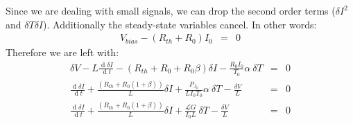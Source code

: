 \documentclass[letterpaper,10pt]{article}
\begin{document}
Since we are dealing with small signals, we can drop the second order terms (${\delta I}^2$ and ${\delta T}{\delta I}$). Additionally the steady-state variables cancel. In other words:
\begin{eqnarray}
	V_{bias} - ( R_{th} + R_0 ) I_0 &=& 0
\end{eqnarray}
Therefore we are left with:
\begin{eqnarray}
	\delta V - L \frac{\operatorname{d} \delta I}{\operatorname{d} t} - \left(R_{th} + R_0 + R_0 \beta \right) \delta I - \frac{R_0 I_0}{T_0}\alpha \: \delta T &=& 0 \\
	\frac{\operatorname{d} \delta I}{\operatorname{d}t} + \frac{\left(R_{th} + R_0 ( 1 + \beta ) \right)}{L} \delta I + \frac{P_{J_0}}{L I_0 T_0}\alpha \: \delta T - \frac{\delta V}{L}&=& 0 \\
	\frac{\operatorname{d} \delta I}{\operatorname{d}t} + \frac{\left(R_{th} + R_0 ( 1 + \beta ) \right)}{L} \delta I + \frac{\mathcal{L} G}{I_0 L} \: \delta T - \frac{\delta V}{L}&=& 0 \label{electrical-diffeq-final}
\end{eqnarray}
\end{document}
